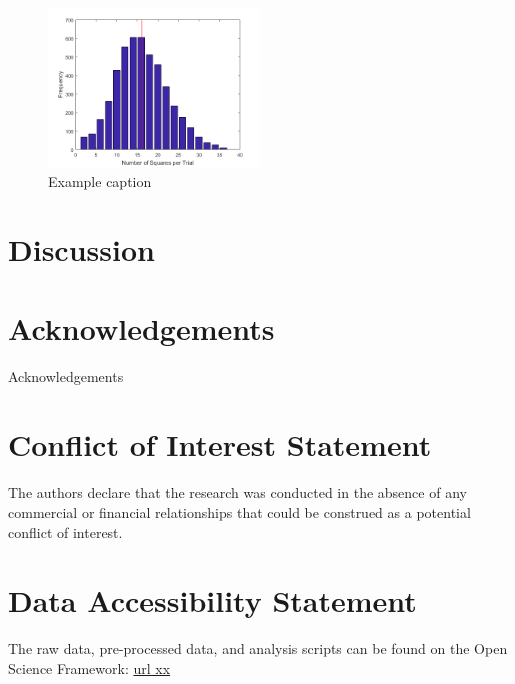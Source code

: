 \documentclass[a4paper,man,floatsintext,12pt]{apa6} %
\begin{document}
\begin{figure}[h!] %
	\centering	
	\includegraphics[width=0.5\textwidth]{exampleImage.png}
	\caption{Example caption}
	\label{fig:exampleImage}	
\end{figure} 

\section{Discussion}




\section*{Acknowledgements}
Acknowledgements

\section*{Conflict of Interest Statement}

The authors declare that the research was conducted in the absence of any commercial or financial relationships that could be construed as a potential conflict of interest.



\section*{Data Accessibility Statement}
The raw data, pre-processed data, and analysis scripts can be found on the Open Science Framework: \url{url xx}



\end{document}
